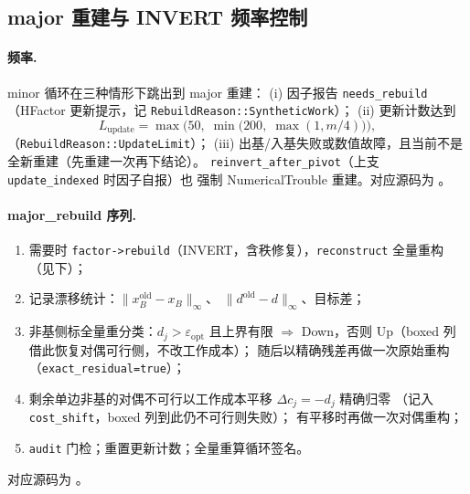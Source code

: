 \subsection{major 重建与 INVERT 频率控制}
\label{subsec:engine-lp-rebuild}

\paragraph{频率.}
minor 循环在三种情形下跳出到 major 重建：
(i) 因子报告 \texttt{needs\_rebuild}（HFactor 更新提示，记
\texttt{RebuildReason::SyntheticWork}）；
(ii) 更新计数达到
\begin{equation}
  L_{\text{update}} = \max\bigl(50,\; \min\bigl(200,\; \max(1, m/4)\bigr)\bigr),
  \label{eq:lpkernel:update-limit}
\end{equation}
（\texttt{RebuildReason::UpdateLimit}）；
(iii) 出基/入基失败或数值故障，且当前不是全新重建（先重建一次再下结论）。
\texttt{reinvert\_after\_pivot}（上支 \texttt{update\_indexed} 时因子自报）也
强制 NumericalTrouble 重建。对应源码为
。

\paragraph{major\_rebuild 序列.}
\begin{enumerate}
  \item 需要时 \texttt{factor->rebuild}（INVERT，含秩修复），\texttt{reconstruct}
        全量重构（见下）；
  \item 记录漂移统计：$\|x_B^{\text{old}} - x_B\|_{\infty}$、
        $\|d^{\text{old}} - d\|_{\infty}$、目标差；
  \item 非基侧标全量重分类：$d_j > \varepsilon_{\text{opt}}$ 且上界有限
        $\Rightarrow$ Down，否则 Up（boxed 列借此恢复对偶可行侧，不改工作成本）；
        随后以精确残差再做一次原始重构（\texttt{exact\_residual=true}）；
  \item 剩余单边非基的对偶不可行以工作成本平移 $\Delta c_j = -d_j$ 精确归零
        （记入 \texttt{cost\_shift}，boxed 列到此仍不可行则失败）；
        有平移时再做一次对偶重构；
  \item \texttt{audit} 门检；重置更新计数；全量重算循环签名。
\end{enumerate}
对应源码为 。


